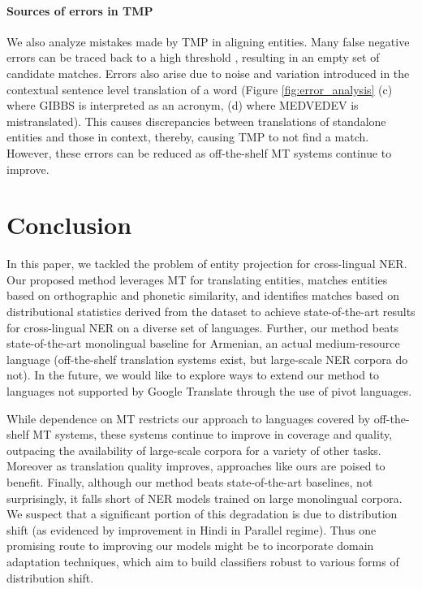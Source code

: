 \documentclass[11pt,a4paper]{article}
\begin{document}
\paragraph{Sources of errors in TMP}
We also analyze mistakes made by TMP in aligning entities. Many false negative errors can be traced back to a high threshold , resulting in an empty set of candidate matches. Errors also arise due to noise and variation introduced in the contextual sentence level translation of a word (Figure \ref{fig:error_analysis} (c) where GIBBS is interpreted as an acronym, (d) where MEDVEDEV is mistranslated). This causes discrepancies between translations of standalone entities and those in context, thereby, causing TMP to not find a match. However, these errors can be reduced as off-the-shelf MT systems continue to improve.
%
 


%
 


\section{Conclusion}
In this paper, we tackled the problem of entity projection for cross-lingual NER. 
Our proposed method leverages MT for translating entities, 
matches entities based on orthographic and phonetic similarity,
and identifies matches based on distributional statistics derived from the dataset 
to achieve state-of-the-art results for cross-lingual NER on a diverse set of languages. 
Further, our method beats state-of-the-art monolingual baseline for Armenian,
an actual medium-resource language 
(off-the-shelf translation systems exist, but large-scale NER corpora do not). 
In the future, we would like to explore ways to extend our method 
to languages not supported by Google Translate through the use of pivot languages.

While dependence on MT restricts our approach to languages covered by off-the-shelf MT systems, 
these systems continue to improve in coverage and quality,
outpacing the availability of large-scale corpora for a variety of other tasks.
Moreover as translation quality improves, approaches like ours are poised to benefit.
Finally, although our method beats state-of-the-art baselines, 
not surprisingly, it falls short of NER models trained on large monolingual corpora. 
We suspect that a significant portion of this degradation is due to distribution shift 
(as evidenced by improvement in Hindi  in Parallel regime). 
Thus one promising route to improving our models
might be to incorporate domain adaptation techniques, 
which aim to build classifiers robust to various forms of distribution shift.


 


\end{document}
